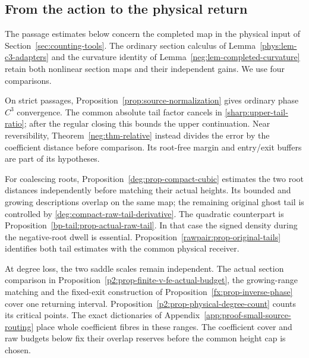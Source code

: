 \subsection{From the action to the physical return}

The passage estimates below concern the completed map in the physical
input of Section~\ref{sec:counting-tools}. The ordinary section calculus
of Lemma~\ref{phys:lem-c3-adapters} and the curvature identity of
Lemma~\ref{neg:lem-completed-curvature} retain both nonlinear section
maps and their independent gains. We use four comparisons.

On strict passages, Proposition~\ref{prop:source-normalization}
gives ordinary phase \(C^3\) convergence. The common absolute tail
factor cancels in \eqref{sharp:upper-tail-ratio}; after the regular
closing this bounds the upper continuation. Near reversibility,
Theorem~\ref{neg:thm-relative} instead divides the error by the
coefficient distance before comparison. Its root-free margin and
entry/exit buffers are part of its hypotheses.

For coalescing roots, Proposition~\ref{deg:prop-compact-cubic}
estimates the two root distances independently before matching their
actual heights. Its bounded and growing descriptions overlap on the
same map; the remaining original ghost tail is controlled by
\eqref{deg:compact-raw-tail-derivative}. The quadratic counterpart is
Proposition~\ref{bp-tail:prop-actual-raw-tail}. In that case the signed
density during the negative-root dwell is essential. Proposition~\ref{rawpair:prop-original-tails}
identifies both tail estimates with the common physical receiver.

At degree loss, the two saddle scales remain independent. The actual
section comparison in Proposition~\ref{p2:prop-finite-v-fe-actual-budget},
the growing-range matching and the fixed-exit construction of
Proposition~\ref{fx:prop-inverse-phase} cover one returning interval.
Proposition~\ref{p2:prop-physical-degree-count} counts its critical
points. The exact dictionaries of
Appendix~\ref{app:proof-small-source-routing} place whole coefficient
fibres in these ranges. The coefficient cover and raw budgets below
fix their overlap reserves before the common height cap is chosen.
